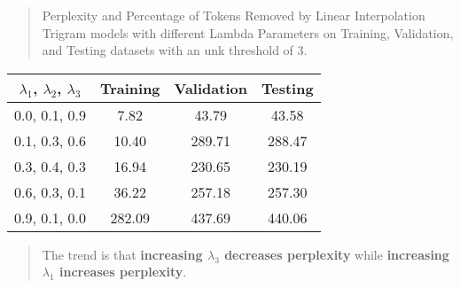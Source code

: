 \begin{quote}
    Perplexity and Percentage of Tokens Removed by Linear Interpolation Trigram models with different Lambda Parameters on Training, Validation, and Testing datasets with an unk threshold of 3.
\end{quote}
\begin{center}
    \begin{tabular}{ |c|c|c|c| } 
	\hline
	$\lambda_1$, $\lambda_2$, $\lambda_3$ & Training & Validation & Testing \\ 
	\hline
	0.0, 0.1, 0.9 & 7.82 & 43.79 & 43.58 \\ 
	\hline
	0.1, 0.3, 0.6 & 10.40 & 289.71 & 288.47 \\ 
	\hline
	0.3, 0.4, 0.3 & 16.94 & 230.65 & 230.19 \\ 
	\hline
	0.6, 0.3, 0.1 & 36.22 & 257.18 & 257.30 \\ 
	\hline
	0.9, 0.1, 0.0 & 282.09 & 437.69 & 440.06 \\ 
	\hline
    \end{tabular}
\end{center}
\begin{quote}
    The trend is that {\bf increasing $\lambda_3$ decreases perplexity} while {\bf increasing $\lambda_1$ increases perplexity}.
\end{quote}
